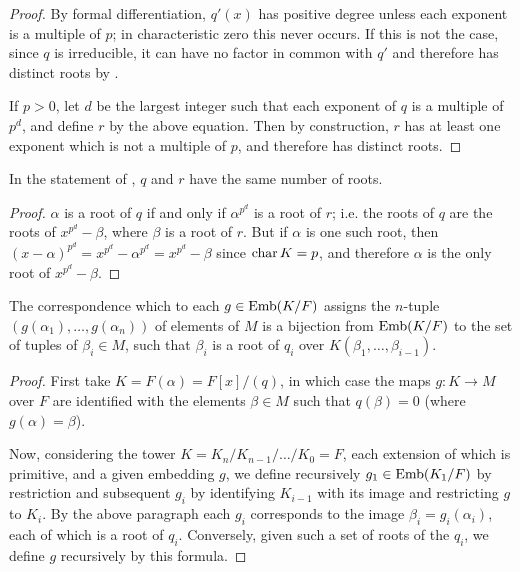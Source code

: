 \begin{proof} By formal differentiation, $q'(x)$ has positive degree unless
each exponent is a multiple of $p$; in characteristic zero this never occurs.
If this is not the case, since $q$ is irreducible, it can have no factor in
common with $q'$ and therefore has distinct roots by .

If $p > 0$, let $d$ be the largest integer such that each exponent of $q$ is a
multiple of $p^d$, and define $r$ by the above equation.  Then by
construction, $r$ has at least one exponent which is not a multiple of $p$,
and therefore has distinct roots. \end{proof}

\begin{corollary} In the statement of , $q$ and $r$ have the same
number of roots.
\label{sep_roots}
\end{corollary}

\begin{proof} $\alpha$ is a root of $q$ if and only if $\alpha^{p^d}$ is a
root of $r$; i.e. the roots of $q$ are the roots of $x^{p^d} - \beta$, where
$\beta$ is a root of $r$.  But if $\alpha$ is one such root, then $(x -
\alpha)^{p^d} = x^{p^d} - \alpha^{p^d} = x^{p^d} - \beta$ since $\operatorname{\text{char}}{K} =
p$, and therefore $\alpha$ is the only root of $x^{p^d} - \beta$. \end{proof}

\begin{lemma} The correspondence which to each $g \in \operatorname{\text{Emb}}(K/F)$ assigns the
$n$-tuple $(g(\alpha_1), \dots, g(\alpha_n))$ of elements of $M$ is a
bijection from $\operatorname{\text{Emb}}(K/F)$ to the set of tuples of $\beta_i \in M$, such that
$\beta_i$ is a root of $q_i$ over $K(\beta_1, \dots, \beta_{i - 1})$.
\label{emb_roots}
\end{lemma}

\begin{proof} First take $K = F(\alpha) = F[x]/(q)$, in which case the maps $g
\colon K \to M$ over $F$ are identified with the elements $\beta \in M$ such
that $q(\beta) = 0$ (where $g(\alpha) = \beta$).

Now, considering the tower $K = K_n / K_{n - 1} / \dots / K_0 = F$, each
extension of which is primitive, and a given embedding $g$, we define
recursively $g_1 \in \operatorname{\text{Emb}}(K_1/F)$ by restriction and subsequent $g_i$ by
identifying $K_{i - 1}$ with its image and restricting $g$ to $K_i$.  By the
above paragraph each $g_i$ corresponds to the image $\beta_i = g_i(\alpha_i)$,
each of which is a root of $q_i$.  Conversely, given such a set of roots of
the $q_i$, we define $g$ recursively by this formula. \end{proof}

